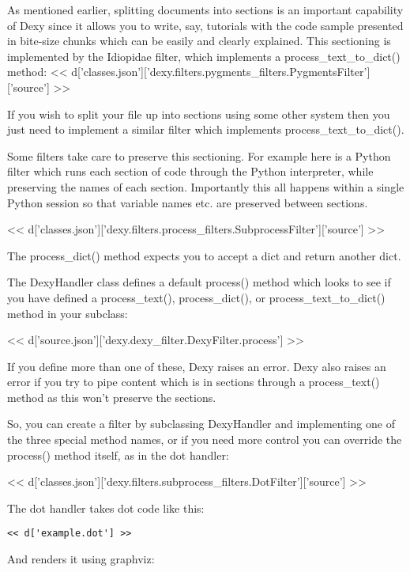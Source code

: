 \documentclass[custom, plainsections]{sciposter}
\begin{document}
\begin{multicols*}{2}
As mentioned earlier, splitting documents into sections is an important capability of Dexy since it allows you to write, say, tutorials with the code sample presented in bite-size chunks which can be easily and clearly explained. This sectioning is implemented by the Idiopidae filter, which implements a process\_text\_to\_dict() method:
\tiny
<< d['classes.json']['dexy.filters.pygments_filters.PygmentsFilter']['source'] >>
\small

If you wish to split your file up into sections using some other system then you just need to implement a similar filter which implements process\_text\_to\_dict().

Some filters take care to preserve this sectioning. For example here is a Python filter which runs each section of code through the Python interpreter, while preserving the names of each section. Importantly this all happens within a single Python session so that variable names etc. are preserved between sections.

\tiny
<< d['classes.json']['dexy.filters.process_filters.SubprocessFilter']['source'] >>
\small

The process\_dict() method expects you to accept a dict and return another dict.

The DexyHandler class defines a default process() method which looks to see if you have defined a process\_text(), process\_dict(), or process\_text\_to\_dict() method in your subclass:

\tiny
<< d['source.json']['dexy.dexy_filter.DexyFilter.process'] >>
\small

If you define more than one of these, Dexy raises an error. Dexy also raises an error if you try to pipe content which is in sections through a process\_text() method as this won't preserve the sections.

So, you can create a filter by subclassing DexyHandler and implementing one of the three special method names, or if you need more control you can override the process() method itself, as in the dot handler:

\tiny
<< d['classes.json']['dexy.filters.subprocess_filters.DotFilter']['source'] >>
\small

\vspace{1cm}

The dot handler takes dot code like this:
\tiny
\begin{Verbatim}
<< d['example.dot'] >>
\end{Verbatim}
\small

And renders it using graphviz:


\end{multicols*}
\end{document}
